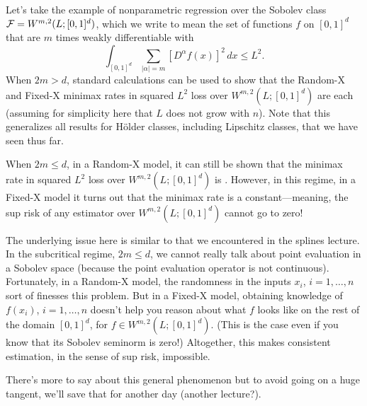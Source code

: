 \documentclass{article}
\begin{document}
Let's take the example of nonparametric regression over the Sobolev class $\mathcal{F} =
W^{m,2}(L; [0,1]^d)$, which we write to mean the set of functions $f$ on
$[0,1]^d$ that are $m$ times weakly differentiable with   
\[
\int_{[0,1]^d} \sum_{|\alpha| = m} [D^\alpha f(x)]^2 \, dx \leq L^2.
\]
When $2m > d$, standard calculations can be used to show that the Random-X and
Fixed-X minimax rates in squared $L^2$ loss over $W^{m,2}(L; [0,1]^d)$ are each 
 (assuming for simplicity here that $L$ does not grow 
with $n$). Note that this generalizes all results for H{\"o}lder classes,
including Lipschitz classes, that we have seen thus far.  

When $2m \leq d$, in a Random-X model, it can still be shown that the minimax
rate in squared $L^2$ loss over $W^{m,2}(L; [0,1]^d)$ is
. However, in this regime, in a Fixed-X model it turns
out that the minimax rate is a constant---meaning, the sup risk of any estimator
over $W^{m,2}(L; [0,1]^d)$ cannot go to zero!

The underlying issue here is similar to that we encountered in the splines
lecture. In the subcritical regime, $2m \leq d$, we cannot really talk about
point evaluation in a Sobolev space (because the point evaluation operator is 
not continuous). Fortunately, in a Random-X model, the randomness in the inputs
$x_i$, $i=1,\dots,n$ sort of finesses this problem. But in a Fixed-X model,
obtaining knowledge of $f(x_i)$, $i=1,\dots,n$ doesn't help you reason about
what $f$ looks like on the rest of the domain $[0,1]^d$, for $f \in W^{m,2}(L; 
[0,1]^d)$. (This is the case even if you know that its Sobolev seminorm is
zero!) Altogether, this makes consistent estimation, in the sense of sup risk,
impossible. 

There's more to say about this general phenomenon but to avoid going on a huge
tangent, we'll save that for another day (another lecture?). 



\end{document}
